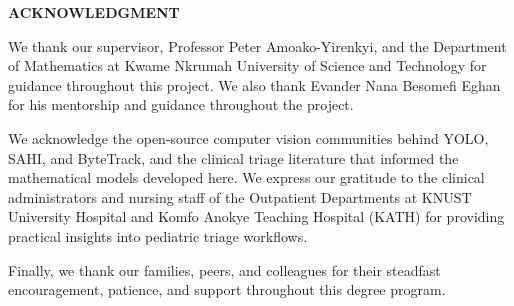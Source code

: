 \begin{center}
    {\bfseries\Large ACKNOWLEDGMENT}
\end{center}
\vspace{0.8cm}

We thank our supervisor, Professor Peter Amoako-Yirenkyi, and the Department of Mathematics at Kwame Nkrumah University of Science and Technology for guidance throughout this project. We also thank Evander Nana Besomefi Eghan for his mentorship and guidance throughout the project. 

We acknowledge the open-source computer vision communities behind YOLO, SAHI, and ByteTrack, and the clinical triage literature that informed the mathematical models developed here. We express our gratitude to the clinical administrators and nursing staff of the Outpatient Departments at KNUST University Hospital and Komfo Anokye Teaching Hospital (KATH) for providing practical insights into pediatric triage workflows. 

Finally, we thank our families, peers, and colleagues for their steadfast encouragement, patience, and support throughout this degree program.